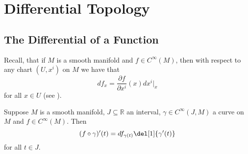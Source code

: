 \chapter{Differential Topology}
\section*{The Differential of a Function}
Recall, that if $M$ is a smooth manifold and $f \in C^\infty(M)$, then with respect to any chart $(U,x^i)$ on $M$ we have that
\begin{equation}
	\label{eq:differential_of_a_function}
	df_x = \frac{\partial f}{\partial x^i}(x)dx^i\vert_x
\end{equation}
\noindent for all $x \in U$ (see \cite[281]{lee:smooth_manifolds:2013}).

\begin{proposition}
	\label{prop:derivative_of_a_function_along_a_curve}
	Suppose $M$ is a smooth manifold, $J \subseteq \mathbb{R}$ an interval, $\gamma \in C^\infty(J,M)$ a curve on $M$ and $f \in C^\infty(M)$. Then
	\begin{equation*}
		(f \circ \gamma)'(t) = df_{\gamma(t)}\del[1]{\gamma'(t)}
	\end{equation*}
	\noindent for all $t \in J$.
\end{proposition}

